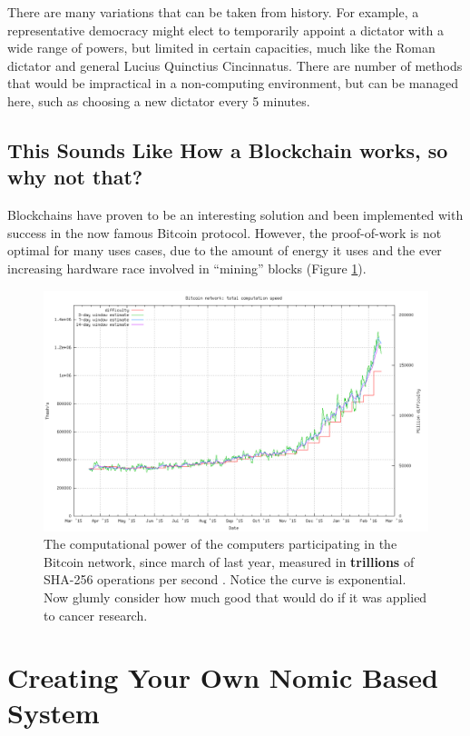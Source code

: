 \documentclass[11pt,letterpaper]{article}
\begin{document}
	There are many variations that can be taken from history.  
	For example, a representative democracy might elect to temporarily appoint a dictator with a wide range of powers, but limited in certain capacities, much like the Roman dictator and general Lucius Quinctius Cincinnatus.
	There are number of methods that would be impractical  in a non-computing  environment, but can be managed here, such as choosing a new dictator every 5 minutes.
	
	
	\subsection{This Sounds Like How a Blockchain works, so why not that?}
	
		
	
	Blockchains have proven to be an interesting solution and been implemented with success in the now famous Bitcoin protocol.
	However, the proof-of-work is not optimal for many uses cases, due to the amount of energy it uses and the ever increasing hardware race involved in ``mining'' blocks (Figure \ref{fig:speed-lin}).
	
	
	\begin{figure}
		\centering
		\includegraphics[width=\linewidth]{figs/speed-lin}
		\caption{The computational power of the computers participating in the Bitcoin network, since march of last year, measured in \textbf{trillions} of SHA-256 operations per second \cite{hashing}.  Notice the curve is exponential.   Now glumly consider how much good that would do if it was applied to cancer research.}
		\label{fig:speed-lin}
	\end{figure}
	
	\section{Creating Your Own Nomic Based System}
	
\end{document}
